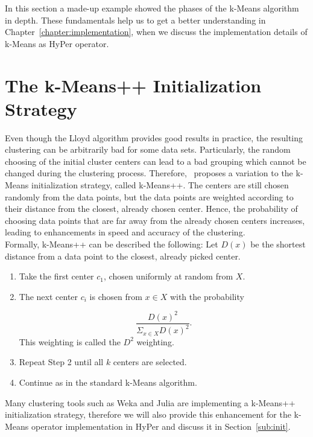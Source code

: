 In this section a made-up example showed the phases of the k-Means algorithm in depth. These fundamentals help us to get a better understanding in Chapter~\ref{chapter:implementation}, when we discuss the implementation details of k-Means as HyPer operator.



\section{The k-Means++ Initialization Strategy}\label{section:kmeans_init}

Even though the Lloyd algorithm provides good results in practice, the resulting clustering can be arbitrarily bad for some data sets. Particularly, the random choosing of the initial cluster centers can lead to a bad grouping which cannot be changed during the clustering process. Therefore,~\cite{kmeans++} proposes a variation to the k-Means initialization strategy, called k-Means++. The centers are still chosen randomly from the data points, but the data points are weighted according to their distance from the closest, already chosen center. Hence, the probability of choosing data points that are far away from the already chosen centers increases, leading to enhancements in speed and accuracy of the clustering.
\\
Formally, k-Means++ can be described the following:
Let $D(x)$ be the shortest distance from a data point to the closest, already picked center.

\begin{enumerate} 
\item Take the first center $c_1$, chosen uniformly at random from $X$.
\item The next center $c_i$ is chosen from $x \in X$ with the probability 

\begin{equation*}
\frac {D(x)^2} {\Sigma_{x \in X} D(x)^2}.
\end{equation*}
This weighting is called the $D^2$ weighting.

\item Repeat Step 2 until all $k$ centers are selected.
\item Continue as in the standard k-Means algorithm.
\end{enumerate}

Many clustering tools such as Weka and Julia are implementing a k-Means++ initialization strategy, therefore we will also provide this enhancement for the k-Means operator implementation in HyPer and discuss it in Section~\ref{sub:init}.

